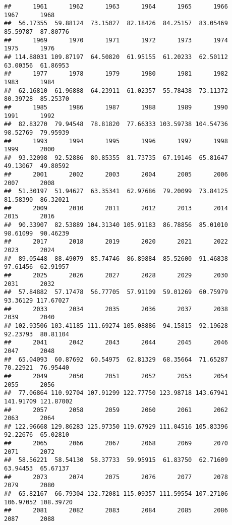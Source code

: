 \documentclass[
]{article}
\begin{document}
\begin{verbatim}
##      1961      1962      1963      1964      1965      1966      1967      1968 
##  56.17355  59.88124  73.15027  82.18426  84.25157  83.05469  85.59787  87.80776 
##      1969      1970      1971      1972      1973      1974      1975      1976 
## 114.88031 109.87197  64.50820  61.95155  61.20233  62.50112  63.00356  61.86953 
##      1977      1978      1979      1980      1981      1982      1983      1984 
##  62.16810  61.96888  64.23911  61.02357  55.78438  73.11372  80.39728  85.25370 
##      1985      1986      1987      1988      1989      1990      1991      1992 
##  82.83270  79.94548  78.81820  77.66333 103.59738 104.54736  98.52769  79.95939 
##      1993      1994      1995      1996      1997      1998      1999      2000 
##  93.32098  92.52886  80.85355  81.73735  67.19146  65.81647  49.13067  49.80592 
##      2001      2002      2003      2004      2005      2006      2007      2008 
##  51.30197  51.94627  63.35341  62.97686  79.20099  73.84125  81.58390  86.32021 
##      2009      2010      2011      2012      2013      2014      2015      2016 
##  90.33907  82.53889 104.31340 105.91183  86.78856  85.01010  98.61099  90.46239 
##      2017      2018      2019      2020      2021      2022      2023      2024 
##  89.05448  88.49079  85.74746  86.89884  85.52600  91.46838  97.61456  62.91957 
##      2025      2026      2027      2028      2029      2030      2031      2032 
##  57.84882  57.17478  56.77705  57.91109  59.01269  60.75979  93.36129 117.67027 
##      2033      2034      2035      2036      2037      2038      2039      2040 
## 102.93506 103.41185 111.69274 105.08886  94.15815  92.19628  92.23793  80.81104 
##      2041      2042      2043      2044      2045      2046      2047      2048 
##  65.04093  60.87692  60.54975  62.81329  68.35664  71.65287  70.22921  76.95440 
##      2049      2050      2051      2052      2053      2054      2055      2056 
##  77.06864 110.92704 107.91299 122.77750 123.98718 143.67941 141.91709 121.87002 
##      2057      2058      2059      2060      2061      2062      2063      2064 
## 122.96668 129.86283 125.97350 119.67929 111.04516 105.83396  92.22676  65.02810 
##      2065      2066      2067      2068      2069      2070      2071      2072 
##  58.56221  58.54130  58.37733  59.95915  61.83750  62.71609  63.94453  65.67137 
##      2073      2074      2075      2076      2077      2078      2079      2080 
##  65.82167  66.79304 132.72081 115.09357 111.59554 107.27106 106.97052 108.39720 
##      2081      2082      2083      2084      2085      2086      2087      2088 

\end{verbatim}
\end{document}
